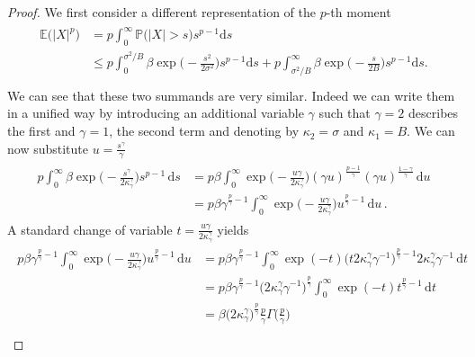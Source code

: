 \documentclass[11pt,reqno]{article}
\numberwithin{equation}{section}
\theoremstyle{definition}
\theoremstyle{plain}
\newcommand{\E}{\ensuremath{\mathbb{E}}}
\newcommand{\p}{\ensuremath{\mathbb{P}}}
\begin{document}
\begin{proof}
We first consider a different representation of the \(p\)-th moment
\begin{align}
\begin{split}
\E\big(\vert X \vert^p\big) & = p\int_0^\infty \p \big(\big\vert X \big\vert > s\big) s^{p-1} \mathrm{d}s\\
& \leq p \int_0^{\sigma^2/B} \beta\exp\Big( -\frac{s^2}{2\sigma^2} \Big) s^{p-1} \mathrm{d}s + p\int_ {\sigma^2/B}^\infty \beta\exp\Big( -\frac{s}{2B} \Big) s^{p-1} \mathrm{d}s. \\
\end{split}
\end{align}
We can see that these two summands are very similar. Indeed we can write them in a unified way by introducing an additional variable \(\gamma\) such that \(\gamma = 2\) describes the first and \(\gamma = 1\), the second term and denoting by \(\kappa_2 = \sigma\) and \(\kappa_1=B\). We can now substitute \(u = \frac{s^\gamma}{\gamma}\)
\begin{align}
\begin{split}
p\int_ {0}^\infty \beta\exp\Big( -\frac{s^\gamma}{2\kappa_\gamma^\gamma } \Big) s^{p-1} \, \mathrm{d}s & = p\beta \int_ {0}^\infty \exp\Big( -\frac{u \gamma}{2\kappa_\gamma^\gamma } \Big) (\gamma u)^{\frac{p-1}{\gamma}} (\gamma u)^{\frac{1-\gamma}{\gamma}} \, \mathrm{d}u \\
& = p \beta \gamma^{\frac{p}{\gamma}-1} \int_ {0}^\infty \exp\Big( -\frac{u \gamma}{2\kappa_\gamma^\gamma } \Big) u^{\frac{p}{\gamma}-1} \, \mathrm{d}u\,.
\end{split}
\end{align}
A standard change of variable \(t = \frac{u\gamma}{{2\kappa_\gamma^\gamma }}\) yields 
\begin{align}
\begin{split}
p \beta \gamma^{\frac{p}{\gamma}-1}\int_ {0}^\infty \exp\Big( -\frac{u \gamma}{2\kappa_\gamma^\gamma } \Big) u^{\frac{p}{\gamma}-1} \, \mathrm{d}u & = p \beta \gamma^{\frac{p}{\gamma}-1} \int_ {0}^\infty \exp( -t ) \big( t 2\kappa_\gamma^\gamma \gamma^{-1}\big)^{\frac{p}{\gamma}-1} 2\kappa_\gamma^\gamma \gamma^{-1} \, \mathrm{d}t \\
& = p \beta \gamma^{\frac{p}{\gamma}-1} \big(2\kappa_\gamma^\gamma \gamma^{-1}\big)^{\frac{p}{\gamma}} \int_{0}^\infty \exp(-t ) t^{\frac{p}{\gamma}-1} \, \mathrm{d}t \\
& =  \beta \big(2\kappa_\gamma^\gamma\big)^{\frac{p}{\gamma}} \frac{p}{\gamma} \Gamma\Big(\frac{p}{\gamma}\Big) \\

\end{split}
\end{align}
\end{proof}
\end{document}
